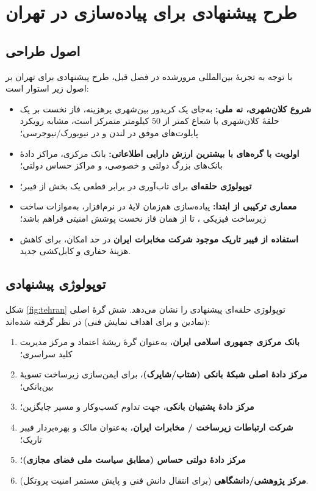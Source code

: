 \chapter{طرح پیشنهادی برای پیاده‌سازی در تهران}
\label{chap:tehran}

\section{اصول طراحی}

با توجه به تجربهٔ بین‌المللی مرورشده در فصل قبل، طرح پیشنهادی برای تهران بر اصول زیر استوار است:

\begin{itemize}
\item \textbf{شروع کلان‌شهری، نه ملی:} به‌جای یک کریدور بین‌شهری پرهزینه، فاز نخست بر یک حلقهٔ  کلان‌شهری با شعاع کمتر از $50$ کیلومتر متمرکز است، مشابه رویکرد پایلوت‌های موفق  در لندن و  در نیویورک/نیوجرسی؛
\item \textbf{اولویت با گره‌های با بیشترین ارزش دارایی اطلاعاتی:} بانک مرکزی، مراکز دادهٔ بانک‌های بزرگ دولتی و خصوصی، و مراکز حساس دولتی؛
\item \textbf{توپولوژی حلقه‌ای } برای تاب‌آوری در برابر قطعی یک بخش از فیبر؛
\item \textbf{معماری ترکیبی از ابتدا:} پیاده‌سازی هم‌زمان لایهٔ  در نرم‌افزار، به‌موازات ساخت زیرساخت فیزیکی ، تا از همان فاز نخست پوشش امنیتی فراهم باشد؛
\item \textbf{استفاده از فیبر تاریک موجود شرکت مخابرات ایران} در حد امکان، برای کاهش هزینهٔ حفاری و کابل‌کشی جدید.
\end{itemize}

\section{توپولوژی پیشنهادی}

شکل \ref{fig:tehran} توپولوژی حلقه‌ای پیشنهادی را نشان می‌دهد. شش گرهٔ اصلی (نمادین و برای اهداف نمایش فنی) در نظر گرفته شده‌اند:

\begin{enumerate}
\item \textbf{بانک مرکزی جمهوری اسلامی ایران}، به‌عنوان گرهٔ ریشهٔ اعتماد  و مرکز مدیریت کلید سراسری؛
\item \textbf{مرکز دادهٔ اصلی شبکهٔ بانکی (شتاب/شاپرک)}، برای ایمن‌سازی زیرساخت تسویهٔ بین‌بانکی؛
\item \textbf{مرکز دادهٔ پشتیبان بانکی}، جهت تداوم کسب‌وکار و مسیر جایگزین؛
\item \textbf{شرکت ارتباطات زیرساخت / مخابرات ایران}، به‌عنوان مالک و بهره‌بردار فیبر تاریک؛
\item \textbf{مرکز دادهٔ دولتی حساس (مطابق سیاست ملی فضای مجازی)}؛
\item \textbf{مرکز پژوهشی/دانشگاهی} (برای انتقال دانش فنی و پایش مستمر امنیت پروتکل).
\end{enumerate}

